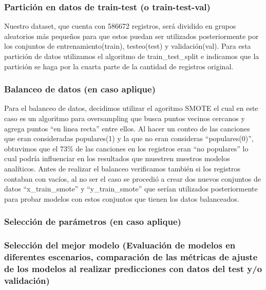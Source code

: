 \documentclass[
  letterpaper,
  DIV=11,
  numbers=noendperiod]{scrartcl}
\begin{document}
\hypertarget{particiuxf3n-en-datos-de-train-test-o-train-test-val}{%
\subsubsection{Partición en datos de train-test (o
train-test-val)}\label{particiuxf3n-en-datos-de-train-test-o-train-test-val}}

Nuestro dataset, que cuenta con 586672 registros, será dividido en
grupos aleatorios más pequeños para que estos puedan ser utilizados
posteriormente por los conjuntos de entrenamiento(train), testeo(test) y
validación(val). Para esta partición de datos utilizamos el algoritmo de
train\_test\_split e indicamos que la partición se haga por la cuarta
parte de la cantidad de registros original.

\hypertarget{balanceo-de-datos-en-caso-aplique}{%
\subsubsection{Balanceo de datos (en caso
aplique)}\label{balanceo-de-datos-en-caso-aplique}}

Para el balanceo de datos, decidimos utilizar el agoritmo SMOTE el cual
en este caso es un algoritmo para oversampling que busca puntos vecinos
cercanos y agrega puntos ``en linea recta'' entre ellos. Al hacer un
conteo de las canciones que eran consideradas populares(1) y la que no
eran consideras ``populares(0)'', obtuvimos que el 73\% de las canciones
en los registros eran ``no populares'' lo cual podría influenciar en los
resultados que muestren nuestros modelos analíticos. Antes de realizar
el balanceo verificamos también si los registros contaban con vacíos, al
no ser el caso se procedió a crear dos nuevos conjuntos de datos
``x\_train\_smote'' y ``y\_train\_smote'' que serían utilizados
posteriormente para probar modelos con estos conjuntos que tienen los
datos balanceados.

\hypertarget{selecciuxf3n-de-paruxe1metros-en-caso-aplique}{%
\subsubsection{Selección de parámetros (en caso
aplique)}\label{selecciuxf3n-de-paruxe1metros-en-caso-aplique}}

\hypertarget{selecciuxf3n-del-mejor-modelo-evaluaciuxf3n-de-modelos-en-diferentes-escenarios-comparaciuxf3n-de-las-muxe9tricas-de-ajuste-de-los-modelos-al-realizar-predicciones-con-datos-del-test-yo-validaciuxf3n}{%
\subsubsection{Selección del mejor modelo (Evaluación de modelos en
diferentes escenarios, comparación de las métricas de ajuste de los
modelos al realizar predicciones con datos del test y/o
validación)}\label{selecciuxf3n-del-mejor-modelo-evaluaciuxf3n-de-modelos-en-diferentes-escenarios-comparaciuxf3n-de-las-muxe9tricas-de-ajuste-de-los-modelos-al-realizar-predicciones-con-datos-del-test-yo-validaciuxf3n}}
\end{document}
